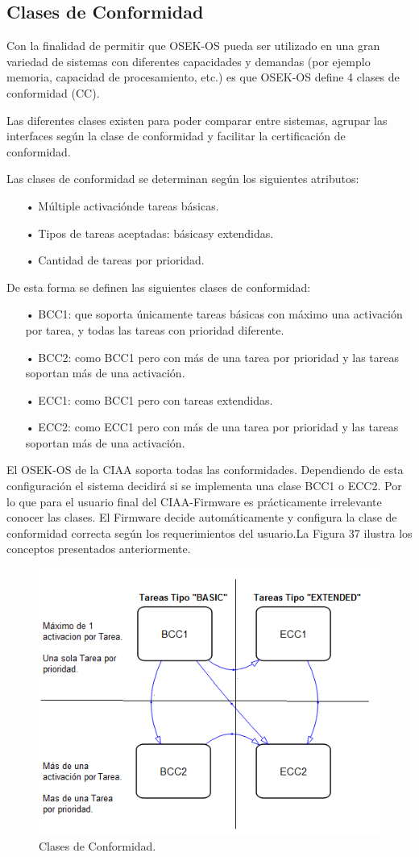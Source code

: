\documentclass[12pt,letterpaper]{article}
\begin{document}
\subsection{Clases de Conformidad}
Con la finalidad de permitir que OSEK-OS pueda ser utilizado en una gran variedad de sistemas con diferentes capacidades y demandas (por ejemplo memoria, capacidad de procesamiento, etc.) es que OSEK-OS define 4 clases de conformidad (CC).

Las diferentes clases existen para poder comparar entre sistemas, agrupar las interfaces según la clase de conformidad y facilitar la certificación de conformidad.

Las clases de conformidad se determinan según los siguientes atributos: 

\begin{enumerate}
\item[•]Múltiple activaciónde tareas básicas.
\item[•]Tipos de tareas aceptadas: básicasy extendidas.
\item[•]Cantidad de tareas por prioridad.
\end{enumerate}

De esta forma se definen las siguientes clases de conformidad:
\begin{enumerate}
\item[•]BCC1: que soporta únicamente tareas  básicas con máximo una activación por tarea, y todas las tareas con prioridad diferente.
\item[•]BCC2: como  BCC1 pero con más de una tarea por prioridad y las tareas soportan más de una activación.
\item[•]ECC1: como BCC1 pero con tareas extendidas.
\item[•]ECC2: como  ECC1 pero con más de una tarea por prioridad y las tareas soportan más de una activación.
\end{enumerate}
El OSEK-OS de la CIAA soporta todas las conformidades. Dependiendo de esta configuración el sistema decidirá si se implementa una clase BCC1 o ECC2. Por lo que para el usuario final del CIAA-Firmware es prácticamente irrelevante conocer las clases. El Firmware decide automáticamente y configura la clase de conformidad correcta según los requerimientos del usuario.La Figura 37 ilustra los conceptos presentados anteriormente.


\begin{figure}[!h]
\centering
\includegraphics[width=8 cm]{figuras/f17.png}
\caption{Clases de Conformidad.}
\label{Fig34}
\end{figure}
\end{document}
